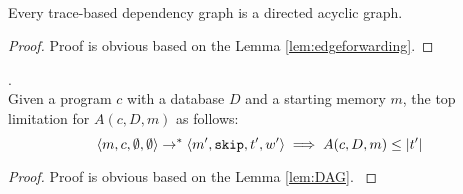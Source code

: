 \documentclass[a4paper,11pt]{article}
\begin{document}
%
\begin{lem}
\label{lem:DAG}
\\
%
{
Every trace-based dependency graph is a directed acyclic graph.
}
\end{lem}
%
{
\begin{proof}
Proof is obvious based on the Lemma \ref{lem:edgeforwarding}.
\end{proof}
}
%
\begin{lem}
.
\\
{
Given a program $c$ with a database $D$ and a starting memory $m$,
the top limitation for $A(c, D, m)$ as follows:
%
\[
\langle m, c, \emptyset, \emptyset \rangle 
\rightarrow^{*} 
\langle m', \mathtt{skip}, t', w' \rangle 
\implies
A(c, D, m) \leq |t'|
\]
}
\end{lem}
%
\begin{proof}
{
Proof is obvious based on the Lemma \ref{lem:DAG}.
}
\end{proof}
%
%
\clearpage
\end{document}
